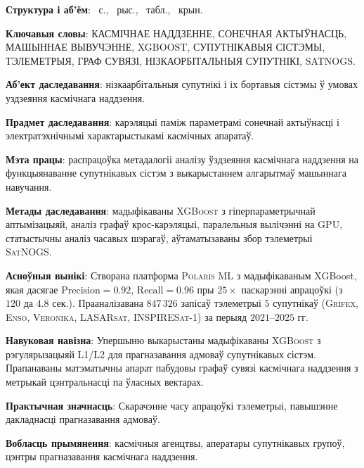 \textbf{Структура і аб’ём}: \maincontentpages~с., \totalfigures~рыс.,
\totaltables~табл., \thetotalsources~крын.

\textbf{Ключавыя словы}: КАСМІЧНАЕ НАДДЗЕННЕ, СОНЕЧНАЯ АКТЫЎНАСЦЬ, МАШЫННАЕ ВЫВУЧЭННЕ, XGBOOST, СУПУТНІКАВЫЯ СІСТЭМЫ, ТЭЛЕМЕТРЫЯ, ГРАФ СУВЯЗІ, НІЗКАОРБІТАЛЬНЫЯ СУПУТНІКІ, SATNOGS.

\textbf{Аб’ект даследавання}: нізкаарбітальныя супутнікі і іх бортавыя сістэмы ў умовах уздзеяння касмічнага наддзення.

\textbf{Прадмет даследавання}: карэляцыі паміж параметрамі сонечнай актыўнасці і электратэхнічнымі характарыстыкамі касмічных апаратаў.

\textbf{Мэта працы}: распрацоўка метадалогіі аналізу ўздзеяння касмічнага наддзення на функцыянаванне супутнікавых сістэм з выкарыстаннем алгарытмаў машыннага навучання.

\textbf{Метады даследавання}: мадыфікаваны \textsc{XGBoost} з гіперпараметрычнай аптымізацыяй, аналіз графаў крос-карэляцыі, паралельныя вылічэнні на \textsc{GPU}, статыстычны аналіз часавых шэрагаў, аўтаматызаваны збор тэлеметрыі \textsc{SatNOGS}.

\textbf{Асноўныя вынікі}: Створана платформа \textsc{Polaris ML} з мадыфікаваным XGBoost, якая дасягае 
$\text{Precision} = 0.92$, $\text{Recall} = 0.96$ пры $25{\times}$ паскарэнні апрацоўкі (з $120$ да $4.8$ сек.). Прааналізавана $847{\,}326$ запісаў тэлеметрыі $5$ супутнікаў (\textsc{Grifex}, \textsc{Enso}, \textsc{Veronika}, \textsc{LASARsat}, \textsc{INSPIRESat-1}) за перыяд $2021$--$2025$ гг.

\textbf{Навуковая навізна}: Упершыню выкарыстаны мадыфікаваны \textsc{XGBoost} з рэгулярызацыяй L1/L2 для прагназавання адмоваў супутнікавых сістэм. Прапанаваны матэматычны апарат пабудовы графаў сувязі касмічнага наддзення з метрыкай цэнтральнасці па ўласных вектарах.

\textbf{Практычная значнасць}: Скарачэнне часу апрацоўкі тэлеметрыі, павышэнне дакладнасці прагназавання адмоваў.

\textbf{Вобласць прымянення}: касмічныя агенцтвы, аператары супутнікавых групоў, цэнтры прагназавання касмічнага наддзення.
